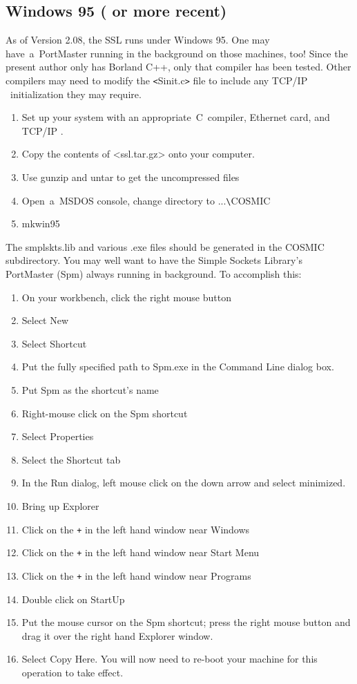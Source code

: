 \documentclass[12pt]{article}
\def\COSMIC{{\small COSMIC}}
\def\SSL{{\small SSL}}
\def\TCP{{\small TCP/IP }}
\begin{document}
\subsection{Windows 95 ( or more recent)}

As of Version 2.08, the {\SSL} runs under Windows 95.  One may
have~a~PortMaster running in the background on those machines,
too!  Since the present author only has Borland C++, only that
compiler has been tested.  Other compilers may need to modify the
\verb`<`Sinit.c\verb`>` file to include any \TCP\ initialization
they may require.

\begin{enumerate}
 \item Set up your system with an appropriate~C~compiler, Ethernet card,
       and \TCP.
 \item Copy the contents of <ssl.tar.gz> onto your computer.
 \item Use gunzip and untar to get the uncompressed files
 \item Open~a~{\small MSDOS} console, change directory to ...\verb`\`{\COSMIC}
 \item mkwin95
\end{enumerate}

The {\sf smplskts.lib} and various {\sf *.exe} files should be generated
in the {\COSMIC} subdirectory.  You may well want to have the Simple Sockets
Library's PortMaster (Spm) always running in background.  To accomplish this:

\begin{enumerate}
 \item On your workbench, click the right mouse button
 \item Select {\sf New}
 \item Select {\sf Shortcut}
 \item Put the fully specified path to Spm.exe in the
       {\sf Command Line} dialog box.
 \item Put {\sf Spm} as the shortcut's name
 \item Right-mouse click on the {\sf Spm} shortcut
 \item Select {\sf Properties}
 \item Select the {\sf Shortcut} tab
 \item In the {\sf Run} dialog, left mouse click on the
       down arrow and select {\sf minimized}.
 \item Bring up Explorer
 \item Click on the \verb`+` in the left hand window near {\sf Windows}
 \item Click on the \verb`+` in the left hand window near {\sf Start Menu}
 \item Click on the \verb`+` in the left hand window near {\sf Programs}
 \item Double click on {\sf StartUp}
 \item Put the mouse cursor on the {\sf Spm} shortcut; press the right
       mouse button and drag it over the right hand Explorer window.
 \item Select {\sf Copy Here}.  You will now need to re-boot your machine
       for this operation to take effect.
\end{enumerate}
\end{document}
